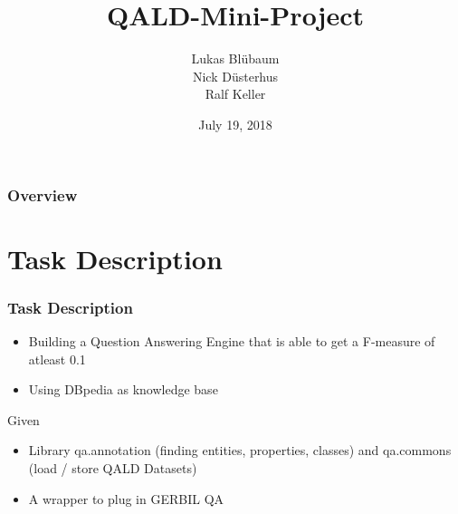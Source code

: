\documentclass{beamer}
\title[QALD]{QALD-Mini-Project} %
\author[Data Science]{Lukas Bl{\"u}baum \\ Nick D{\"u}sterhus \\ Ralf Keller} %
\institute[UPB] %
{
University of Paderborn \\ %
\medskip
\textit{https://github.com/LukasBluebaum/QALD-Mini-Project} %
}
\date{July 19, 2018} %
\begin{document}
\begin{frame}
\titlepage %
\end{frame}

\begin{frame}
\frametitle{Overview} %
\tableofcontents %
\end{frame}


\section{Task Description} %

\begin{frame}
\frametitle{Task Description}
\begin{itemize}
	\item Building a Question Answering Engine that is able to get a F-measure of atleast 0.1 
	\item Using DBpedia as knowledge base
\end{itemize}
\begin{block}{Given}
\begin{itemize}
	\item Library qa.annotation (finding entities, properties, classes) and qa.commons (load / store QALD Datasets)
	\item A wrapper to plug in GERBIL QA
\end{itemize}
\end{block}
\end{frame}
\end{document}
